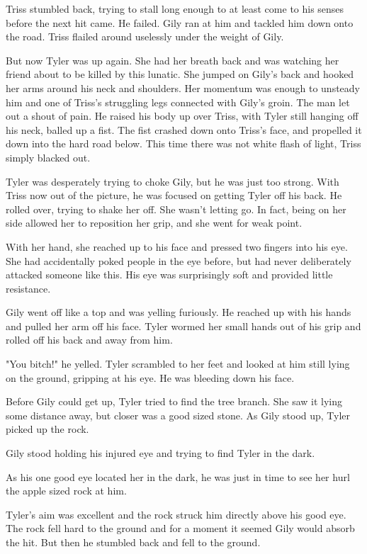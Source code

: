 \documentclass[courier]{sffms}
\begin{document}
Triss stumbled back, trying to stall long enough to
at least come to his senses before the next hit came.
He failed. Gily ran at him and tackled him down onto
the road. Triss flailed around uselessly under the
weight of Gily.

But now Tyler was up again. She had her breath
back and was watching her friend about to be
killed by this lunatic. She jumped on Gily's back
and hooked her arms around his neck and
shoulders. Her momentum was enough to
unsteady him and one of Triss's struggling legs
connected with Gily's groin. The man let out a shout
of pain. He raised his body up over Triss, with Tyler
still hanging off his neck, balled up a fist. The fist
crashed down onto Triss's face, and propelled it
down into the hard road below. This time there
was not white flash of light, Triss simply blacked out.

Tyler was desperately trying to choke Gily, but he was
just too strong. With Triss now out of the picture,
he was focused on getting Tyler off his back. He rolled
over, trying to shake her off. She wasn't letting go. In
fact, being on her side allowed her to reposition her
grip, and she went for weak point.

With her hand, she reached up to his face and pressed
two fingers into his eye. She had accidentally poked
people in the eye before, but had never deliberately
attacked someone like this. His eye was surprisingly
soft and provided little resistance.

Gily went off like a top and was yelling furiously.
He reached up with his hands and pulled her arm
off his face. Tyler wormed her small hands out of his
grip and rolled off his back and away from him.

"You bitch!" he yelled. Tyler scrambled to her feet and
looked at him still lying on the ground, gripping at his
eye. He was bleeding down his face.

Before Gily could get up, Tyler tried to find the tree
branch. She saw it lying some distance away, but closer
was a good sized stone. As Gily stood up, Tyler picked
up the rock.

Gily stood holding his injured eye and trying to find Tyler
in the dark.

As his one good eye located her in the dark, 
he was just in time to see her hurl the
apple sized rock at him.

Tyler's aim was excellent and the rock struck
him directly above his good eye. The rock
fell hard to the ground and for a moment it
seemed Gily would absorb the hit. But then
he stumbled back and fell to the ground.
\end{document}

